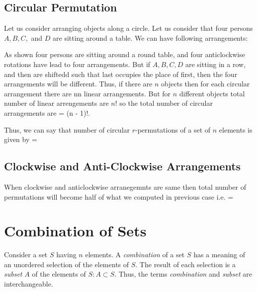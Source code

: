 \subsection{Circular Permutation}
Let us consider arranging objects along a circle. Let us consider that four persons $A, B, C,$ and $D$ are sitting around a table. We
can have following arrangements:

As shown four persons are sitting around a round table, and four anticlockwise rotations have lead to four arrangements. But if
$A,B,C,D$ are sitting in a row, and then are shiftedd such that last occupies the place of first, then the four arrangements will be
different. Thus, if there are $n$ objects then for each circular arrangement there are nn linear arrangements. But for $n$ different
objects total number of linear arrengements are $n!$ so the total number of circular arrangements are \startformula {} = (n - 1)!.\stopformula

Thus, we can say that number of circular $r$-permutations of a set of $n$ elements is given by \startformula {} = \stopformula

\subsection{Clockwise and Anti-Clockwise Arrangements}
When clockwise and anticlockwise arranegemnts are same then total number of permutations will become half of what we computed in
previous case i.e. \startformula {} = \stopformula

\section{Combination of Sets}
Consider a set $S$ having $n$ elements. A {\it combination} of a set $S$ has a meaning of an unordered selection of the elements
of $S$. The result of each selection is a {\it subset} $A$ of the elements of $S: A\subset S$. Thus, the terms
{\it combination} and {\it subset} are interchangeable.


